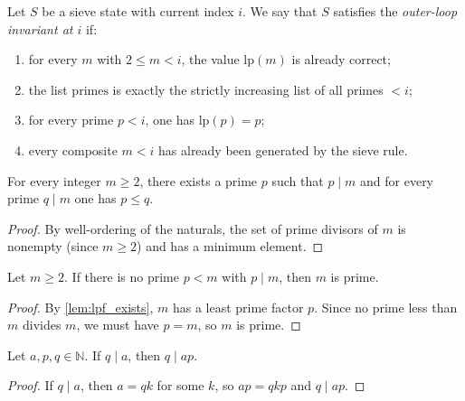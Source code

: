 \begin{definition}
    \label{def:outer_invariant}
    Let $S$ be a sieve state with current index $i$.
    We say that $S$ satisfies the \emph{outer-loop invariant at $i$} if:
    \begin{enumerate}
        \item for every $m$ with $2\le m < i$, the value $\mathrm{lp}(m)$ is already correct;
        \item the list $\mathrm{primes}$ is exactly the strictly increasing list of all primes $< i$;
        \item for every prime $p < i$, one has $\mathrm{lp}(p)=p$;
        \item every composite $m < i$ has already been generated by the sieve rule.
    \end{enumerate}
\end{definition}

\begin{lemma}
    \label{lem:lpf_exists}
    For every integer $m\ge 2$, there exists a prime $p$ such that $p\mid m$ and
    for every prime $q\mid m$ one has $p\le q$.
\end{lemma}
\begin{proof}
    By well-ordering of the naturals, the set of prime divisors of $m$ is nonempty (since $m \ge 2$) and has a minimum element.
\end{proof}

\begin{lemma}
    \label{lem:no_small_divisor_prime}
    Let $m\ge 2$.
    If there is no prime $p < m$ with $p\mid m$, then $m$ is prime.
\end{lemma}
\begin{proof}
    By \ref{lem:lpf_exists}, $m$ has a least prime factor $p$. Since no prime less than $m$ divides $m$, we must have $p = m$, so $m$ is prime.
\end{proof}

\begin{lemma}
    \label{lem:divisor_lifts_to_product}
    Let $a,p,q\in\mathbb{N}$.
    If $q\mid a$, then $q\mid ap$.
\end{lemma}
\begin{proof}
    If $q \mid a$, then $a = qk$ for some $k$, so $ap = qkp$ and $q \mid ap$.
\end{proof}

